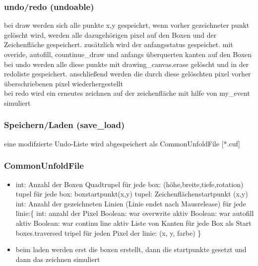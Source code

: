 \subsubsection{undo/redo (undoable)}
\label{subsubsec:undoRedo}

bei draw werden sich alle punkte x,y gespeichrt, wenn vorher gezeichneter punkt gelöscht wird, werden alle dazugehörigen pixel auf den Boxen und der Zeichenfläche gespeichert. zusätzlich wird der anfangsstatus gespeichet. mit overide, autofill, countinue\_draw und anfangs überquerten kanten auf den Boxen bei undo werden alle diese punkte mit drawing\_canvas.erase
gelöscht und in der redoliste gespeichert. anschließend werden die
durch diese gelöschten pixel vorher überschriebenen pixel wiederhergestellt\\

bei redo wird ein erneutes zeichnen auf der zeichenfläche mit hilfe
von my\_event simuliert\\


\subsubsection{Speichern/Laden (save\_load)}
\label{subsubsec:speichernLaden}

eine modifzierte Undo-Liste wird abgespeichert als CommonUnfoldFile
{[}{*}.cuf{]}


\subsubsection{CommonUnfoldFile}
\label{subsubsec:commonunfoldfile}

\begin{itemize}
\item int: Anzahl der Boxen Quadtrupel für jede box: (höhe,breite,tiefe,rotation)
tupel für jede box: boxstartpunkt(x,y) tupel: Zeichenflächenstartpunkt
(x,y) int: Anzahl der gezeichneten Linien (Linie endet nach Mausrelease)
für jede linie:\{ int: anzahl der Pixel Boolean: war overwrite aktiv
Boolean: war autofill aktiv Boolean: war continu line aktiv Liste
von Kanten für jede Box als Start boxes.traversed tripel für jeden
Pixel der linie: (x, y, farbe) \}
\item beim laden werden erst die boxen erstellt, dann die startpunkte gesetzt
und dann das zeichnen simuliert
\end{itemize}


